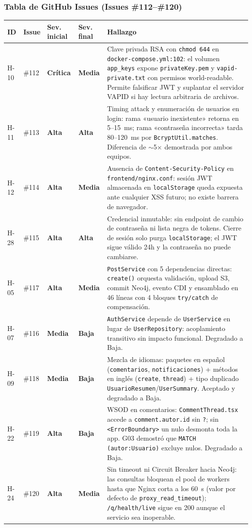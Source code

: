 \documentclass[10pt,a4paper]{article}
\newcommand{\code}[1]{\nolinkurl{#1}}
\newcommand{\badgeCritica}{\colorbox{red!20}{\textcolor{red!80!black}{\textbf{\footnotesize Crítica}}}}
\newcommand{\badgeAlta}{\colorbox{orange!20}{\textcolor{orange!90!black}{\textbf{\footnotesize Alta}}}}
\newcommand{\badgeMedia}{\colorbox{yellow!35}{\textcolor{brown!90!black}{\textbf{\footnotesize Media}}}}
\newcommand{\badgeBaja}{\colorbox{blue!15}{\textcolor{blue!80!black}{\textbf{\footnotesize Baja}}}}
\begin{document}
\subsubsection{Tabla de GitHub Issues (Issues \#112–\#120)}

\begin{tabularx}{\textwidth}{p{0.9cm} p{0.8cm} p{1.7cm} p{1.8cm} X}
\rowcolor{tableheader}\toprule
ID & Issue & Sev. inicial & Sev. final & Hallazgo \\ \midrule
H-10 & \#112 & \badgeCritica & \badgeMedia & Clave privada RSA con \code{chmod 644} en \code{docker-compose.yml:102}: el volumen \code{app\_keys} expone \code{privateKey.pem} y \code{vapid-private.txt} con permisos world-readable. Permite falsificar JWT y suplantar el servidor VAPID si hay lectura arbitraria de archivos. \\ \midrule
H-11 & \#113 & \badgeAlta & \badgeAlta & Timing attack y enumeración de usuarios en login: rama «usuario inexistente» retorna en 5--15~ms; rama «contraseña incorrecta» tarda 80--120~ms por \code{BcryptUtil.matches}. Diferencia de $\sim$5$\times$ demostrada por ambos equipos. \\ \midrule
H-12 & \#114 & \badgeAlta & \badgeMedia & Ausencia de \code{Content-Security-Policy} en \code{frontend/nginx.conf}: sesión JWT almacenada en \code{localStorage} queda expuesta ante cualquier XSS futuro; no existe barrera de navegador. \\ \midrule
H-28 & \#115 & \badgeAlta & \badgeAlta & Credencial inmutable: sin endpoint de cambio de contraseña ni lista negra de tokens. Cierre de sesión solo purga \code{localStorage}; el JWT sigue válido 24h y la contraseña no puede cambiarse. \\ \midrule
H-05 & \#117 & \badgeAlta & \badgeMedia & \code{PostService} con 5 dependencias directas: \code{create()} orquesta validación, upload S3, commit Neo4j, evento CDI y ensamblado en 46 líneas con 4 bloques \code{try/catch} de compensación. \\ \midrule
H-07 & \#116 & \badgeMedia & \badgeBaja & \code{AuthService} depende de \code{UserService} en lugar de \code{UserRepository}: acoplamiento transitivo sin impacto funcional. Degradado a Baja. \\ \midrule
H-09 & \#118 & \badgeMedia & \badgeBaja & Mezcla de idiomas: paquetes en español (\code{comentarios}, \code{notificaciones}) + métodos en inglés (\code{create}, \code{thread}) + tipo duplicado \code{UsuarioResumen}/\code{UserSummary}. Aceptado y degradado a Baja. \\ \midrule
H-22 & \#119 & \badgeAlta & \badgeBaja & WSOD en comentarios: \code{CommentThread.tsx} accede a \code{comment.autor.id} sin \code{?}; sin \code{<ErrorBoundary>} un nulo desmonta toda la app. G03 demostró que \code{MATCH (autor:Usuario)} excluye nulos. Degradado a Baja. \\ \midrule
H-24 & \#120 & \badgeAlta & \badgeMedia & Sin timeout ni Circuit Breaker hacia Neo4j: las consultas bloquean el pool de workers hasta que Nginx corta a los 60~s (valor por defecto de \code{proxy\_read\_timeout}); \code{/q/health/live} sigue en 200 aunque el servicio sea inoperable. \\ \bottomrule
\end{tabularx}
\end{document}
